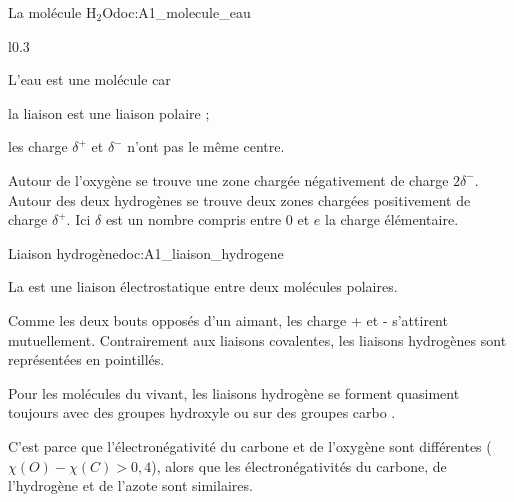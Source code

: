 \begin{doc}{La molécule H$_2$O}{doc:A1_molecule_eau} 
  \begin{wrapfigure}[3]{l}{0.3\linewidth}
    \centering
    \vspace*{-22pt}
  \end{wrapfigure}
  \phantom{b}\vspace*{-20pt}
    
  \begin{importants}
    L'eau est une molécule  car 
    \begin{listePoints}
      \item la liaison  est une liaison polaire ;
      \item les charge $\delta^+$ et $\delta^-$ n'ont pas le même centre.
    \end{listePoints}
  \end{importants}

  Autour de l'oxygène se trouve une zone chargée négativement de charge $2\delta^-$.
  Autour des deux hydrogènes se trouve deux zones chargées positivement de charge $\delta^+$.  
  Ici $\delta$ est un nombre compris entre $0$ et $e$ la charge élémentaire.
\end{doc}

\begin{doc}{Liaison hydrogène}{doc:A1_liaison_hydrogene}
  \begin{importants}
    La  est une liaison électrostatique entre deux molécules polaires.
  \end{importants}
  Comme les deux bouts opposés d'un aimant, les charge + et - s'attirent mutuellement.
  Contrairement aux liaisons covalentes, les liaisons hydrogènes sont représentées en pointillés.

  \begin{importants}  
    Pour les molécules du vivant, les liaisons hydrogène se forment quasiment toujours avec des groupes hydroxyle  ou sur des groupes carbo .
  \end{importants}
  C'est parce que l'électronégativité du carbone et de l'oxygène sont différentes
  ($\chi(O) - \chi(C) > 0,4$),
  alors que les électronégativités du carbone, de l'hydrogène et de l'azote sont similaires.
\end{doc}

